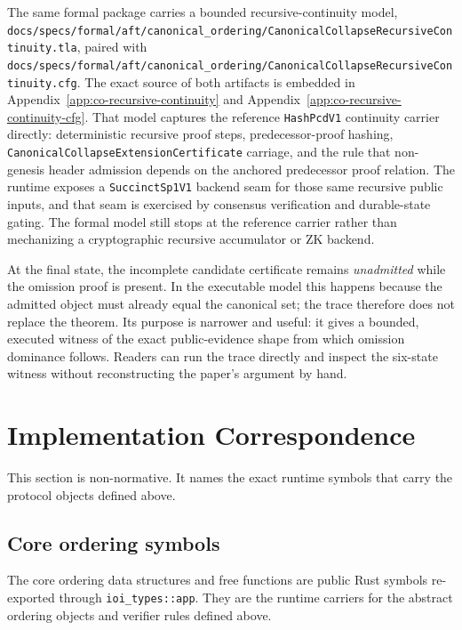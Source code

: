 \documentclass[11pt]{article}
\newcommand{\code}[1]{\texttt{#1}}
\begin{document}
The same formal package carries a bounded recursive-continuity model,
\code{docs/specs/formal/aft/canonical\_ordering/CanonicalCollapseRecursiveContinuity.tla},
paired with
\code{docs/specs/formal/aft/canonical\_ordering/CanonicalCollapseRecursiveContinuity.cfg}.
The exact source of both artifacts is embedded in
Appendix~\ref{app:co-recursive-continuity} and
Appendix~\ref{app:co-recursive-continuity-cfg}.
That model captures the reference \code{HashPcdV1} continuity carrier directly:
deterministic recursive proof steps, predecessor-proof hashing,
\code{CanonicalCollapseExtensionCertificate} carriage, and the rule that
non-genesis header admission depends on the anchored predecessor proof relation.
The runtime exposes a \code{SuccinctSp1V1} backend seam for those
same recursive public inputs, and that seam is exercised by consensus
verification and durable-state gating. The formal model still stops at the
reference carrier rather than mechanizing a cryptographic recursive
accumulator or ZK backend.

At the final state, the incomplete candidate certificate remains
\emph{unadmitted} while the omission proof is present. In the executable
model this happens because the admitted object must already equal the canonical
set; the trace therefore does not replace the theorem. Its purpose is narrower
and useful: it gives a bounded, executed witness of the exact public-evidence
shape from which omission dominance follows. Readers can run the trace directly
and inspect the six-state witness without reconstructing the paper's argument by
hand.

\section{Implementation Correspondence}

This section is non-normative. It names the exact runtime symbols that carry
the protocol objects defined above.

\subsection{Core ordering symbols}

The core ordering data structures and free functions are public Rust symbols
re-exported through \code{ioi\_types::app}. They are the runtime carriers for
the abstract ordering objects and verifier rules defined above.
\end{document}
